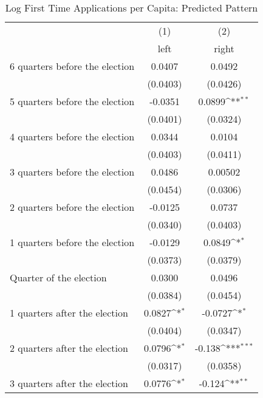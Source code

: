 \begin{table}[htbp]\centering
\def\sym#1{\ifmmode^{#1}\else\(^{#1}\)\fi}
\caption{Log First Time Applications per Capita: Predicted Pattern}
\begin{tabular}{l*{2}{c}}
\hline\hline
                    &\multicolumn{1}{c}{(1)}&\multicolumn{1}{c}{(2)}\\
                    &\multicolumn{1}{c}{left}&\multicolumn{1}{c}{right}\\
\hline
 6 quarters before the election&      0.0407         &      0.0492         \\
                    &    (0.0403)         &    (0.0426)         \\
[1em]
 5 quarters before the election&     -0.0351         &      0.0899\sym{**} \\
                    &    (0.0401)         &    (0.0324)         \\
[1em]
 4 quarters before the election&      0.0344         &      0.0104         \\
                    &    (0.0403)         &    (0.0411)         \\
[1em]
 3 quarters before the election&      0.0486         &     0.00502         \\
                    &    (0.0454)         &    (0.0306)         \\
[1em]
 2 quarters before the election&     -0.0125         &      0.0737         \\
                    &    (0.0340)         &    (0.0403)         \\
[1em]
 1 quarters before the election&     -0.0129         &      0.0849\sym{*}  \\
                    &    (0.0373)         &    (0.0379)         \\
[1em]
Quarter of the election&      0.0300         &      0.0496         \\
                    &    (0.0384)         &    (0.0454)         \\
[1em]
 1 quarters after the election&      0.0827\sym{*}  &     -0.0727\sym{*}  \\
                    &    (0.0404)         &    (0.0347)         \\
[1em]
 2 quarters after the election&      0.0796\sym{*}  &      -0.138\sym{***}\\
                    &    (0.0317)         &    (0.0358)         \\
[1em]
 3 quarters after the election&      0.0776\sym{*}  &      -0.124\sym{**} \\

\end{tabular}
\end{table}

